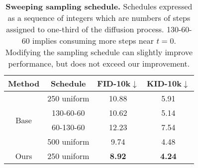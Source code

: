 \begin{table}[]
\centering
\begin{tabular}{cccc}
\hline
Method                & Schedule    & FID-10k$\downarrow$   & KID-10k$\downarrow$ \\ \hline
\multirow{4}{*}{Base} & 250 uniform & 10.88 & 5.91 \\
                      & 130-60-60   & 10.62  &  5.14    \\
                      & 60-130-60   & 12.23  &  7.54  \\
                      & 500 uniform & 9.74  & 4.48 \\ \hline
Ours                  & 250 uniform & \textbf{8.92}  & \textbf{4.24}  \\ \hline
\end{tabular}
\caption{\textbf{Sweeping sampling schedule.} Schedules expressed as a sequence of integers which are numbers of steps assigned to one-third of the diffusion process. 130-60-60 implies consuming more steps near $t=0$. Modifying the sampling schedule can slightly improve performance, but does not exceed our improvement. %
}

\label{table:sweep}
\end{table}